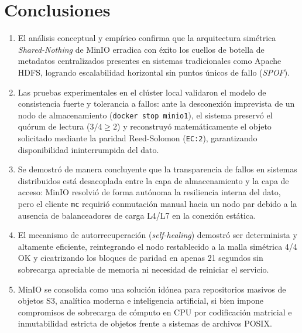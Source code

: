 \documentclass[12pt,a4paper]{article}
\begin{document}
\section{Conclusiones}
\begin{enumerate}[leftmargin=*]
    \item El análisis conceptual y empírico confirma que la arquitectura simétrica \emph{Shared-Nothing} de MinIO erradica con éxito los cuellos de botella de metadatos centralizados presentes en sistemas tradicionales como Apache HDFS, logrando escalabilidad horizontal sin puntos únicos de fallo (\emph{SPOF}).
    \item Las pruebas experimentales en el clúster local validaron el modelo de consistencia fuerte y tolerancia a fallos: ante la desconexión imprevista de un nodo de almacenamiento (\texttt{docker stop minio1}), el sistema preservó el quórum de lectura ($3/4 \ge 2$) y reconstruyó matemáticamente el objeto solicitado mediante la paridad Reed-Solomon (\texttt{EC:2}), garantizando disponibilidad ininterrumpida del dato.
    \item Se demostró de manera concluyente que la transparencia de fallos en sistemas distribuidos está desacoplada entre la capa de almacenamiento y la capa de acceso: MinIO resolvió de forma autónoma la resiliencia interna del dato, pero el cliente \texttt{mc} requirió conmutación manual hacia un nodo par debido a la ausencia de balanceadores de carga L4/L7 en la conexión estática.
    \item El mecanismo de autorrecuperación (\emph{self-healing}) demostró ser determinista y altamente eficiente, reintegrando el nodo restablecido a la malla simétrica 4/4 OK y cicatrizando los bloques de paridad en apenas 21 segundos sin sobrecarga apreciable de memoria ni necesidad de reiniciar el servicio.
    \item MinIO se consolida como una solución idónea para repositorios masivos de objetos S3, analítica moderna e inteligencia artificial, si bien impone compromisos de sobrecarga de cómputo en CPU por codificación matricial e inmutabilidad estricta de objetos frente a sistemas de archivos POSIX.
\end{enumerate}

\end{document}
